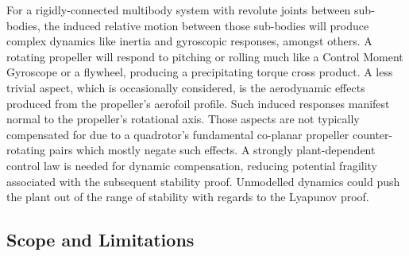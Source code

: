 \par
For a rigidly-connected multibody system with revolute joints between sub-bodies, the induced relative motion between those sub-bodies will produce complex dynamics like inertia and gyroscopic responses, amongst others. A rotating propeller will respond to pitching or rolling much like a Control Moment Gyroscope \cite{cmg} or a flywheel, producing a precipitating torque cross product. A less trivial aspect, which is occasionally considered, is the aerodynamic effects produced from the propeller's aerofoil profile. Such induced responses manifest normal to the propeller's rotational axis. Those aspects are not typically compensated for due to a quadrotor's fundamental co-planar propeller counter-rotating pairs which mostly negate such effects. A strongly plant-dependent control law is needed for dynamic compensation, reducing potential fragility associated with the subsequent stability proof. Unmodelled dynamics could push the plant out of the range of stability with regards to the Lyapunov proof. 
\subsection{Scope and Limitations}
\label{subsec:intro.foreword.scopeandlim}
